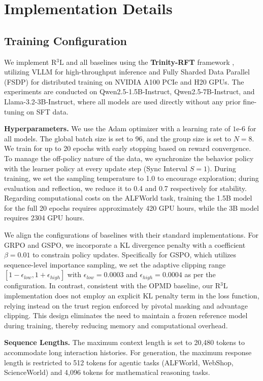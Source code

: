 \section{Implementation Details}
\label{app:implementation}

\subsection{Training Configuration}
We implement R$^3$L and all baselines using the \textbf{Trinity-RFT} framework \cite{pan2025trinity}, utilizing VLLM for high-throughput inference and Fully Sharded Data Parallel (FSDP) for distributed training on NVIDIA A100 PCIe and H20 GPUs. The experiments are conducted on Qwen2.5-1.5B-Instruct, Qwen2.5-7B-Instruct, and Llama-3.2-3B-Instruct, where all models are used directly without any prior fine-tuning on SFT data.

\textbf{Hyperparameters.} We use the Adam optimizer with a learning rate of $1\text{e-}6$ for all models. The global batch size is set to 96, and the group size is set to $N=8$. We train for up to 20 epochs with early stopping based on reward convergence. To manage the off-policy nature of the data, we synchronize the behavior policy with the learner policy at every update step (Sync Interval $S=1$). During training, we set the sampling temperature to 1.0 to encourage exploration; during evaluation and reflection, we reduce it to 0.4 and 0.7 respectively for stability. Regarding computational costs on the ALFWorld task, training the 1.5B model for the full 20 epochs requires approximately 420 GPU hours, while the 3B model requires 2304 GPU hours.

We align the configurations of baselines with their standard implementations. For GRPO and GSPO, we incorporate a KL divergence penalty with a coefficient $\beta = 0.01$ to constrain policy updates. Specifically for GSPO, which utilizes sequence-level importance sampling, we set the adaptive clipping range $[1-\epsilon_{low}, 1+\epsilon_{high}]$ with $\epsilon_{low}=0.0003$ and $\epsilon_{high}=0.0004$ as per the configuration. In contrast, consistent with the OPMD baseline, our R$^3$L implementation does not employ an explicit KL penalty term in the loss function, relying instead on the trust region enforced by pivotal masking and advantage clipping. This design eliminates the need to maintain a frozen reference model during training, thereby reducing memory and computational overhead.

\textbf{Sequence Lengths.} The maximum context length is set to 20,480 tokens to accommodate long interaction histories. For generation, the maximum response length is restricted to 512 tokens for agentic tasks (ALFWorld, WebShop, ScienceWorld) and 4,096 tokens for mathematical reasoning tasks.

